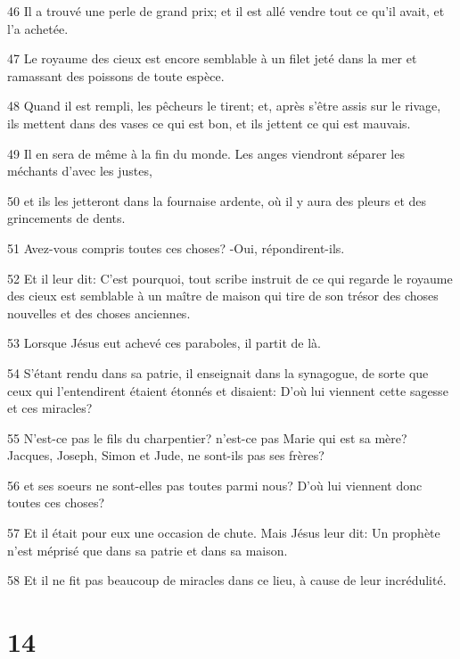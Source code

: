 \par 46 Il a trouvé une perle de grand prix; et il est allé vendre tout ce qu'il avait, et l'a achetée.
\par 47 Le royaume des cieux est encore semblable à un filet jeté dans la mer et ramassant des poissons de toute espèce.
\par 48 Quand il est rempli, les pêcheurs le tirent; et, après s'être assis sur le rivage, ils mettent dans des vases ce qui est bon, et ils jettent ce qui est mauvais.
\par 49 Il en sera de même à la fin du monde. Les anges viendront séparer les méchants d'avec les justes,
\par 50 et ils les jetteront dans la fournaise ardente, où il y aura des pleurs et des grincements de dents.
\par 51 Avez-vous compris toutes ces choses? -Oui, répondirent-ils.
\par 52 Et il leur dit: C'est pourquoi, tout scribe instruit de ce qui regarde le royaume des cieux est semblable à un maître de maison qui tire de son trésor des choses nouvelles et des choses anciennes.
\par 53 Lorsque Jésus eut achevé ces paraboles, il partit de là.
\par 54 S'étant rendu dans sa patrie, il enseignait dans la synagogue, de sorte que ceux qui l'entendirent étaient étonnés et disaient: D'où lui viennent cette sagesse et ces miracles?
\par 55 N'est-ce pas le fils du charpentier? n'est-ce pas Marie qui est sa mère? Jacques, Joseph, Simon et Jude, ne sont-ils pas ses frères?
\par 56 et ses soeurs ne sont-elles pas toutes parmi nous? D'où lui viennent donc toutes ces choses?
\par 57 Et il était pour eux une occasion de chute. Mais Jésus leur dit: Un prophète n'est méprisé que dans sa patrie et dans sa maison.
\par 58 Et il ne fit pas beaucoup de miracles dans ce lieu, à cause de leur incrédulité.

\chapter{14}

